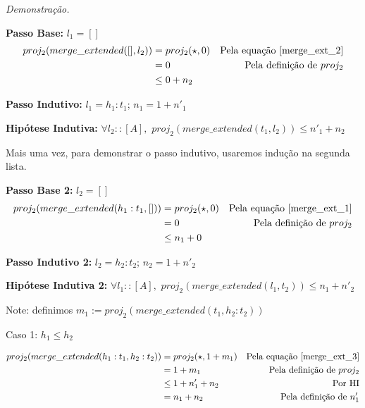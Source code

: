 \documentclass[12pt, oneside, a4paper,english,brazil]{abntex2}
\begin{document}
\noindent \textit{Demonstra\c{c}\~ao.}

\textbf{Passo Base: } $l_{1} = []$
\begin{align*}
  proj_{2}(merge\_extended([], l_{2})) &= proj_{2}(\star, 0) &\text{Pela equa\c{c}\~ao \ref{merge_ext_2}}\\
                                       &= 0 &\text{Pela defini\c{c}\~ao de $proj_{2}$} \\
  &\le 0 + n_{2}
\end{align*}

\textbf{Passo Indutivo: } $l_{1} = h_{1} : t_{1}$; $n_{1} = 1 + n'_{1}$

\textbf{Hip\'otese Indutiva: } $\forall l_{2} :: [A], \,\, proj_{2}(merge\_extended(t_{1}, l_{2})) \le n'_{1} + n_{2}$

Mais uma vez, para demonstrar o passo indutivo, usaremos indu\c{c}\~ao na segunda lista.

\textbf{Passo Base 2: } $l_{2} = []$
\begin{align*}
  proj_{2}(merge\_extended(h_{1} : t_{1}, [])) &= proj_{2}(\star, 0) &\text{Pela equa\c{c}\~ao \ref{merge_ext_1}}\\
                                               &= 0 &\text{Pela defini\c{c}\~ao de $proj_{2}$} \\
  &\le n_{1} + 0
\end{align*}

\textbf{Passo Indutivo 2: } $l_{2} = h_{2} :  t_{2}$; $n_{2} = 1 + n'_{2}$

\textbf{Hip\'otese Indutiva 2: } $\forall l_{1} :: [A], \,\, proj_{2}(merge\_extended(l_{1}, t_{2})) \le n_{1} + n'_{2}$

Note: definimos $m_{1} := proj_{2}(merge\_extended(t_{1}, h_{2} : t_{2}))$

Caso 1: $h_{1} \le h_{2}$

\begin{align*}
  proj_{2}(merge\_extended(h_{1} : t_{1}, h_{2} : t_{2})) &= proj_{2}(\star, 1 + m_{1}) &\text{Pela equa\c{c}\~ao \ref{merge_ext_3}} \\
                                                          &= 1 + m_{1} &\text{Pela defini\c{c}\~ao de $proj_{2}$} \\
                                                          &\le 1 + n'_{1} + n_{2} &\text{Por HI} \\
  &= n_{1} + n_{2} &\text{Pela defini\c{c}\~ao de $n'_{1}$}
\end{align*}
\end{document}
